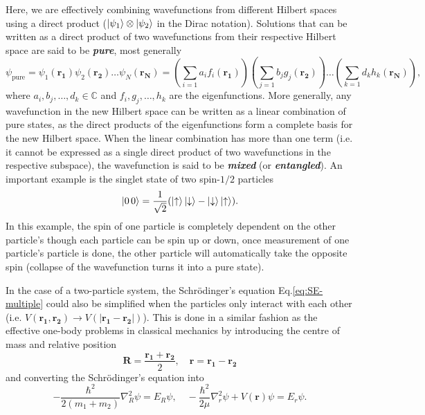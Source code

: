 \documentclass{article}
\newcommand{\up}{\ket{\uparrow}} %
\newcommand{\dn}{\ket{\downarrow}} %
\theoremstyle{nonumberplain}
\begin{document}
Here, we are effectively combining wavefunctions from different Hilbert spaces using a direct product ($\ket{\psi_1}\otimes \ket{\psi_2}$ in the Dirac notation). Solutions that can be written as a direct product of two wavefunctions from their respective Hilbert space are said to be \textit{\textbf{pure}}, most generally 
\[
    \psi_{\text{pure}} = \psi_{1}(\mathbf{r_1}) \psi_{2}(\mathbf{r_2} ) \ldots  \psi_N (\mathbf{r_N}) =   
    \left( 
        \sum_{i=1} a_i f_{i} (\mathbf{r_1} )
    \right)
    \left( 
        \sum_{j=1} b_j g_{j} (\mathbf{r_2} )
    \right)
    \ldots 
    \left( 
        \sum_{k=1} d_k h_{k} (\mathbf{r_N} )
    \right), 
\]
where $a_i, b_j, \ldots , d_k \in \mathbb{C} $ and $f_i, g_j, \ldots , h_k $ are the eigenfunctions. More generally, any wavefunction in the new Hilbert space can be written as a linear combination of pure states, as the direct products of the eigenfunctions form a complete basis for the new Hilbert space. When the linear combination has more than one term (i.e. it cannot be expressed as a single direct product of two wavefunctions in the respective subspace), the wavefunction is said to be \textit{\textbf{mixed}} (or \textit{\textbf{entangled}}). An important example is the singlet state of two spin-$1/2$ particles 
\[
    \ket{0 \, 0} = \frac{1}{\sqrt{2} } (\up \dn - \dn \up).
\]
In this example, the spin of one particle is completely dependent on the other particle's \textemdash though each particle can be spin up or down, once measurement of one particle's particle is done, the other particle will automatically take the opposite spin (collapse of the wavefunction turns it into a pure state). 

In the case of a two-particle system, the Schrödinger's equation Eq.\eqref{eq:SE-multiple} could also be simplified when the particles only interact with each other (i.e. $V(\mathbf{r_1},\mathbf{r_2} ) \to V(\left\vert \mathbf{r_1} - \mathbf{r_2}   \right\vert   )$). This is done in a similar fashion as the effective one-body problems in classical mechanics by introducing the centre of mass and relative position 
\[
    \mathbf{R}  = \frac{\mathbf{r_1} + \mathbf{r_2} }{2}, \quad 
    \mathbf{r}  = \mathbf{r_1} - \mathbf{r_2}
\] 
and converting the Schrödinger's equation into 
\[
        -\frac{\hbar ^{2} }{2(m_1+ m_2)} \nabla^{2}_R \psi = E_R \psi ,\quad 
        -\frac{\hbar ^{2} }{2\mu } \nabla ^{2} _r \psi + V(\mathbf{r} ) \psi  = E_r \psi.
\]
\end{document}
